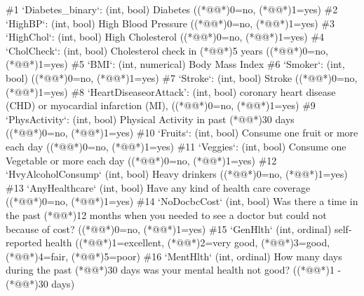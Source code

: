 \documentclass[11pt]{article}
\begin{document}
\begin{codeoutput}
\#1 `Diabetes\_binary`: (int, bool) Diabetes ((*@@*)0=no, (*@@*)1=yes)
\#2 `HighBP`: (int, bool) High Blood Pressure ((*@@*)0=no, (*@@*)1=yes)
\#3 `HighChol`: (int, bool) High Cholesterol ((*@@*)0=no, (*@@*)1=yes)
\#4 `CholCheck`: (int, bool) Cholesterol check in (*@@*)5 years ((*@@*)0=no, (*@@*)1=yes)
\#5 `BMI`: (int, numerical) Body Mass Index
\#6 `Smoker`: (int, bool) ((*@@*)0=no, (*@@*)1=yes)
\#7 `Stroke`: (int, bool) Stroke ((*@@*)0=no, (*@@*)1=yes)
\#8 `HeartDiseaseorAttack': (int, bool) coronary heart disease (CHD) or myocardial infarction (MI), ((*@@*)0=no, (*@@*)1=yes)
\#9 `PhysActivity`: (int, bool) Physical Activity in past (*@@*)30 days ((*@@*)0=no, (*@@*)1=yes)
\#10 `Fruits`: (int, bool) Consume one fruit or more each day ((*@@*)0=no, (*@@*)1=yes)
\#11 `Veggies`: (int, bool) Consume one Vegetable or more each day ((*@@*)0=no, (*@@*)1=yes)
\#12 `HvyAlcoholConsump` (int, bool) Heavy drinkers ((*@@*)0=no, (*@@*)1=yes)
\#13 `AnyHealthcare` (int, bool) Have any kind of health care coverage ((*@@*)0=no, (*@@*)1=yes)
\#14 `NoDocbcCost` (int, bool) Was there a time in the past (*@@*)12 months when you needed to see a doctor but could not because of cost? ((*@@*)0=no, (*@@*)1=yes)
\#15 `GenHlth` (int, ordinal) self-reported health ((*@@*)1=excellent, (*@@*)2=very good, (*@@*)3=good, (*@@*)4=fair, (*@@*)5=poor)
\#16 `MentHlth` (int, ordinal) How many days during the past (*@@*)30 days was your mental health not good? ((*@@*)1 - (*@@*)30 days)

\end{codeoutput}
\end{document}
